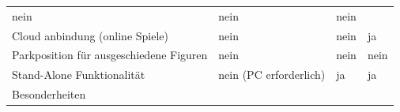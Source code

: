 \begin{longtable}[]{@{}llll@{}}
\begin{minipage}[t]{0.24\columnwidth}
nein\strut
\end{minipage} & \begin{minipage}[t]{0.26\columnwidth}\raggedright
nein\strut
\end{minipage} & \begin{minipage}[t]{0.19\columnwidth}\raggedright
nein\strut
\end{minipage}\tabularnewline
\begin{minipage}[t]{0.20\columnwidth}\raggedright
Cloud anbindung (online Spiele)\strut
\end{minipage} & \begin{minipage}[t]{0.24\columnwidth}\raggedright
nein\strut
\end{minipage} & \begin{minipage}[t]{0.26\columnwidth}\raggedright
nein\strut
\end{minipage} & \begin{minipage}[t]{0.19\columnwidth}\raggedright
ja\strut
\end{minipage}\tabularnewline
\begin{minipage}[t]{0.20\columnwidth}\raggedright
Parkposition für ausgeschiedene Figuren\strut
\end{minipage} & \begin{minipage}[t]{0.24\columnwidth}\raggedright
nein\strut
\end{minipage} & \begin{minipage}[t]{0.26\columnwidth}\raggedright
nein\strut
\end{minipage} & \begin{minipage}[t]{0.19\columnwidth}\raggedright
nein\strut
\end{minipage}\tabularnewline
\begin{minipage}[t]{0.20\columnwidth}\raggedright
Stand-Alone Funktionalität\strut
\end{minipage} & \begin{minipage}[t]{0.24\columnwidth}\raggedright
nein (PC erforderlich)\strut
\end{minipage} & \begin{minipage}[t]{0.26\columnwidth}\raggedright
ja\strut
\end{minipage} & \begin{minipage}[t]{0.19\columnwidth}\raggedright
ja\strut
\end{minipage}\tabularnewline
\begin{minipage}[t]{0.20\columnwidth}\raggedright
Besonderheiten\strut
\end{minipage} & \begin{minipage}[t]{0.24\columnwidth}\raggedright

\end{minipage}
\end{longtable}
